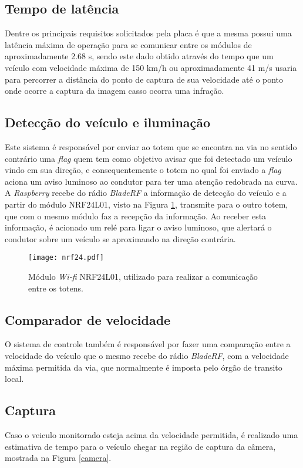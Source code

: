     
    \subsection{Tempo de latência}
    Dentre os principais requisitos solicitados pela placa é que a mesma possui uma latência máxima de operação para se comunicar entre os módulos de aproximadamente 2.68 s, sendo este dado obtido através do tempo que um veículo com velocidade máxima de 150 km/h ou aproximadamente 41 m/s usaria para percorrer a distância do ponto de captura de sua velocidade até o ponto onde ocorre a captura da imagem casso ocorra uma infração. 
    
    \subsection{Detecção do veículo e iluminação}
    Este sistema é responsável por enviar ao totem que se encontra na via no sentido contrário uma \emph{flag} quem tem como objetivo avisar que foi detectado um veículo vindo em sua direção, e consequentemente o totem no qual foi enviado a \emph{flag} aciona um aviso luminoso ao condutor para ter uma atenção redobrada na curva. A \emph{Raspberry} recebe do rádio \emph{BladeRF} a informação de detecção do veículo e a partir do módulo NRF24L01, visto na Figura \ref{nrf24}, transmite para o outro totem, que com o mesmo módulo faz a recepção da informação. Ao receber esta informação, é acionado um relé para ligar o aviso luminoso, que alertará o condutor sobre um veículo se aproximando na direção contrária.
    
    \begin{figure}[H]
    \centering
    \texttt{[image: nrf24.pdf]}
    \caption{Módulo \emph{Wi-fi} NRF24L01, utilizado para realizar a comunicação entre os totens.}
    \label{nrf24}
\end{figure}


    \subsection{Comparador de velocidade}
    O sistema de controle também é responsável por fazer uma comparação entre a velocidade do veículo que o mesmo recebe do rádio \emph{BladeRF}, com a velocidade máxima permitida da via, que normalmente é imposta pelo órgão de transito local.

    \subsection{Captura}
    Caso o veiculo monitorado esteja acima da velocidade permitida, é realizado uma estimativa de tempo para o veículo chegar na região de captura da câmera, mostrada na Figura \ref{camera}.
    
